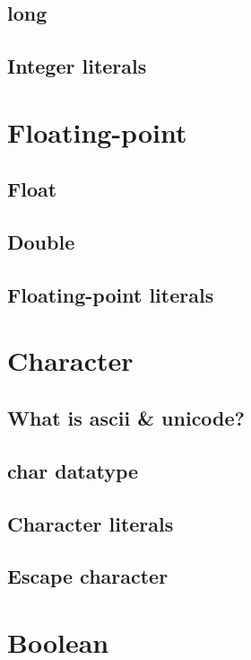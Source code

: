 \documentclass[14pt,fleqn]{extbook} %
\begin{document}
\subsection{long}

\subsection{Integer literals}

\section{Floating-point}

\subsection{Float}

\subsection{Double}

\subsection{Floating-point literals}

\section{Character}

\subsection{What is ascii \& unicode?}

\subsection{char datatype}

\subsection{Character literals}

\subsection{Escape character}

\section{Boolean}

\end{document}
